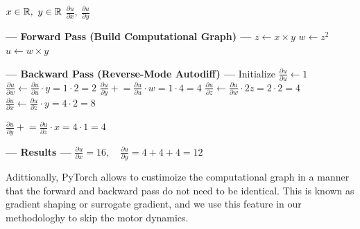 \begin{algorithm}
\caption{Example Backpropagation for the function $u(x,y) = y(xy)^2$}

\begin{algorithmic}
\large
\Require $x \in \mathbb{R}, \ y \in \mathbb{R}$
\Ensure $\frac{\partial u}{\partial x},\ \frac{\partial u}{\partial y}$

\State \textbf{--- Forward Pass {\footnotesize (Build Computational Graph)} ---}
\State $z \gets x \times y$ 
\State $w \gets z^2$ 
\State $u \gets w \times y$ 

\State \textbf{--- Backward Pass {\footnotesize (Reverse-Mode Autodiff)} ---}
\State Initialize $\frac{\partial u}{\partial u} \gets 1$
\State $\frac{\partial u}{\partial w} \gets \frac{\partial u}{\partial u} \cdot y = 1 \cdot 2 = 2$ 
\State $\frac{\partial u}{\partial y} \mathrel{+}= \frac{\partial u}{\partial u} \cdot w = 1 \cdot 4 = 4$ 
\State $\frac{\partial u}{\partial z} \gets \frac{\partial u}{\partial w} \cdot 2z = 2 \cdot 2 = 4$ 
\State $\frac{\partial u}{\partial x} \gets \frac{\partial u}{\partial z} \cdot y = 4 \cdot 2 = 8$  

\State $\frac{\partial u}{\partial y} \mathrel{+}= \frac{\partial u}{\partial z} \cdot x = 4 \cdot 1 = 4$ 

\State \textbf{--- Results ---}
\State $\frac{\partial u}{\partial x} = 16,\quad \frac{\partial u}{\partial y} = 4 + 4 + 4 = 12$

\end{algorithmic}
\label{alg:backprop}
\end{algorithm}


Adittionally, PyTorch allows to custimoize the computational graph in a manner that the forward and backward pass do not need to be identical.
This is known as gradient shaping or surrogate gradient, and we use this feature in our methodologhy to skip the motor dynamics.


